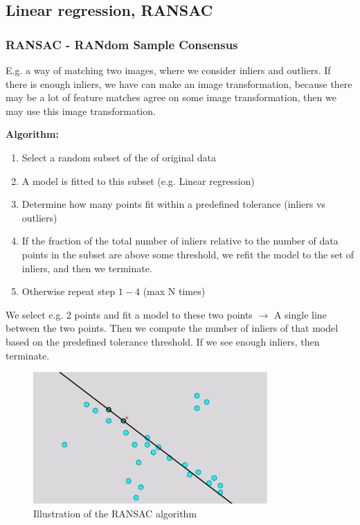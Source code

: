 \documentclass[a4paper]{article}
\begin{document}
\subsection{Linear regression, RANSAC}


\subsubsection{RANSAC - RANdom Sample Consensus}
E.g. a way of matching two images, where we consider inliers and outliers. If there is enough inliers, we have can make an image transformation, because there may be a lot of feature matches agree on some image transformation, then we may use this image transformation.

\textbf{Algorithm:} 
\begin{enumerate}
	\item Select a random subset of the of original data
	\item A model is fitted to this subset (e.g. Linear regression)
	\item Determine how many points fit within a predefined tolerance (inliers vs outliers)
	\item If the fraction of the total number of inliers relative to the number of data points in the subset are above some threshold, we refit the model to the set of inliers, and then we terminate. 
	\item Otherwise repeat step $1-4$ (max N times)
\end{enumerate}

We select e.g. 2 points and fit a model to these two points $ \rightarrow $ A single line between the two points. Then we compute the number of inliers of that model based on the predefined tolerance threshold. If we see enough inliers, then terminate. 

\begin{figure}[H]
\centering
\includegraphics[width=0.8\textwidth]{figures/RANSAC.png}
\caption{Illustration of the RANSAC algorithm}
\label{fig:RANSAC}
\end{figure} 
\end{document}
